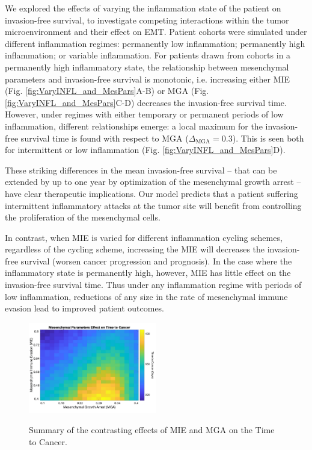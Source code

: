 \documentclass[11pt]{article}
\begin{document}
We explored the effects of varying the inflammation state of the patient on invasion-free survival, to investigate competing interactions within the tumor microenvironment and their effect on EMT. Patient cohorts were simulated under different inflammation regimes: permanently low inflammation; permanently high inflammation; or variable inflammation. For patients drawn from cohorts in a permanently high inflammatory state, the relationship between mesenchymal parameters and invasion-free survival is monotonic, i.e. increasing either MIE (Fig. \ref{fig:VaryINFL_and_MesPars}A-B) or MGA (Fig. \ref{fig:VaryINFL_and_MesPars}C-D) decreases the invasion-free survival time.
However, under regimes with either temporary or permanent periods of low inflammation, different relationships emerge: a local maximum for the invasion-free survival time is found with respect to MGA ($\Delta_\text{MGA}= 0.3$). This is seen both for intermittent or low inflammation (Fig. \ref{fig:VaryINFL_and_MesPars}D). 
\par
These striking differences in the mean invasion-free survival -- that can be extended by up to one year by optimization of the mesenchymal growth arrest -- have clear therapeutic implications. 
Our model predicts that a patient suffering intermittent inflammatory attacks at the tumor site will benefit from controlling the proliferation of the mesenchymal cells.
\par
In contrast, when MIE is varied for different inflammation cycling schemes, regardless of the cycling scheme, increasing the MIE will decreases the invasion-free survival (worsen cancer progression and prognosis). In the case where the inflammatory state is permanently high, however, MIE has little effect on the invasion-free survival time. Thus under any inflammation regime with periods of low inflammation, reductions of any size in the rate of mesenchymal immune evasion lead to improved patient outcomes.

\begin{figure}
\center
{\includegraphics[width=0.5\textwidth]{Figure5/heatmap2.jpg}}
\caption{Summary of the contrasting effects of MIE and MGA on the Time to Cancer.
}
\label{fig:MIEvsMGA}
\end{figure}
\end{document}
